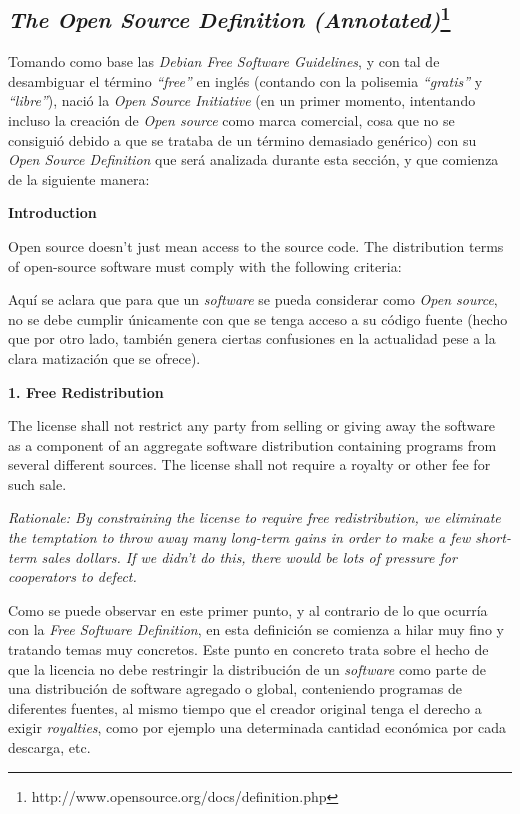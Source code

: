 \subsection{\textit{The Open Source Definition
(Annotated)}\footnote{http://www.opensource.org/docs/definition.php}}

Tomando como base las \textit{Debian Free Software Guidelines}, y con tal de
desambiguar el término \textit{``free''} en inglés (contando con la polisemia
\textit{``gratis''} y \textit{``libre''}), nació la \textit{Open Source
Initiative} (en un primer momento, intentando incluso la creación de
\textit{Open source} como marca comercial, cosa que no se consiguió debido a que
se trataba de un término demasiado genérico) con su \textit{Open Source
Definition} que será analizada durante esta sección, y que comienza de la
siguiente manera:\newline

{\bf Introduction

Open source doesn't just mean access to the source code. The distribution terms
of open-source software must comply with the following criteria:}\newline

Aquí se aclara que para que un \textit{software} se pueda considerar como
\textit{Open source}, no se debe cumplir únicamente con que se tenga acceso a su
código fuente (hecho que por otro lado, también genera ciertas confusiones en la
actualidad pese a la clara matización que se ofrece).\newline

{\bf 1. Free Redistribution

The license shall not restrict any party from selling or giving away the
software as a component of an aggregate software distribution containing
programs from several different sources. The license shall not require a royalty
or other fee for such sale.}

\textit{Rationale: By constraining the license to require free redistribution,
we eliminate the temptation to throw away many long-term gains in order to make
a few short-term sales dollars. If we didn't do this, there would be lots
of pressure for cooperators to defect.}\newline

Como se puede observar en este primer punto, y al contrario de lo que ocurría
con la \textit{Free Software Definition}, en esta definición se comienza a hilar
muy fino y tratando temas muy concretos. Este punto en concreto trata sobre
el hecho de que la licencia no debe restringir la distribución de un
\textit{software} como parte de una distribución de software agregado o global,
conteniendo programas de diferentes fuentes, al mismo tiempo que el creador
original tenga el derecho a exigir \textit{royalties}, como por ejemplo una
determinada cantidad económica por cada descarga, etc.\newline

